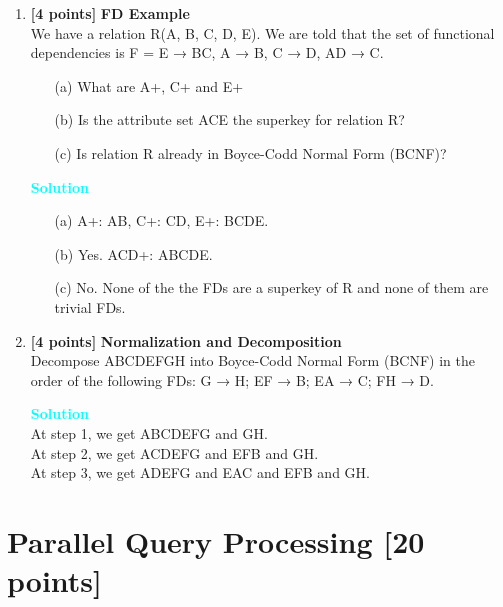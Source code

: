 \documentclass[10pt]{article}
\newenvironment{solution}
    { \begin{mdframed}[backgroundcolor=gray!10] \textcolor{cyan}{\textbf{Solution}} \\}
    {  \end{mdframed}}
\begin{document}
\begin{enumerate}
	\item \textbf{[4 points]} \textbf{FD Example} \\
	      We have a relation R(A, B, C, D, E). We are told that the set of functional dependencies is
	      F = {E → BC, A → B, C → D, AD → C}.
	      \begin{itemize}
		      \item[(a)] What are A+, C+ and E+
		      \item[(b)] Is the attribute set ACE the superkey for relation R?
		      \item[(c)] Is relation R already in Boyce-Codd Normal Form (BCNF)?
	      \end{itemize}
	      \begin{solution}
		      \begin{itemize}
			      \item[(a)] A+: AB, C+: CD, E+: BCDE.
			      \item[(b)] Yes. ACD+: ABCDE.
			      \item[(c)] No. None of the the FDs are a superkey of R and none of them are trivial FDs.
		      \end{itemize}
	      \end{solution}

	\item \textbf{[4 points]} \textbf{Normalization and Decomposition} \\
	      Decompose ABCDEFGH into Boyce-Codd Normal Form (BCNF) in the order of the following FDs:
	      G → H; EF → B; EA → C; FH → D.
	      \begin{solution}
		      At step 1, we get ABCDEFG and GH. \\
		      At step 2, we get ACDEFG and EFB and GH. \\
		      At step 3, we get ADEFG and EAC and EFB and GH.
	      \end{solution}


\end{enumerate}



\newpage
\section{Parallel Query Processing \textbf{[20 points]}}
\end{document}
